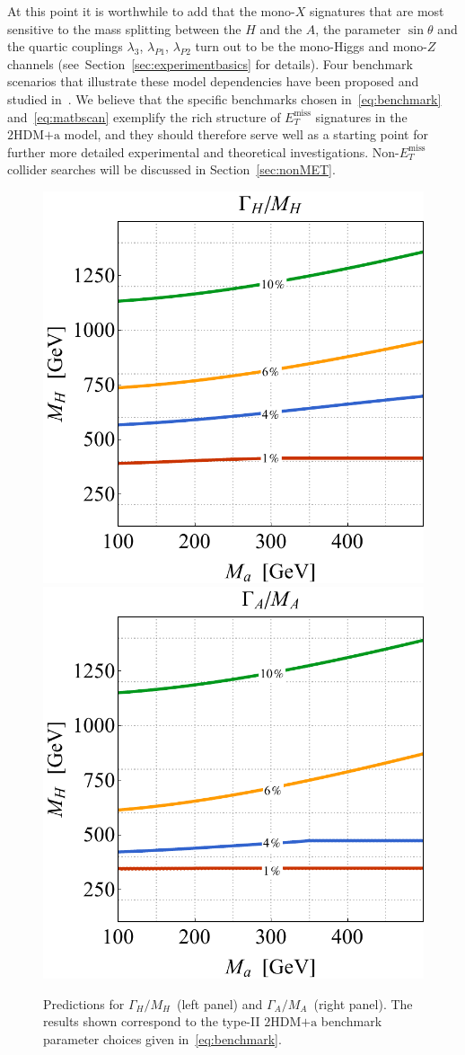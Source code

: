 \documentclass[a4paper, 11pt,notoc]{article}
\newcommand{\MET}{\ensuremath{E_T^\mathrm{miss}}\xspace}
\newcommand{\hdma}{\ensuremath{\textrm{2HDM+a}}\xspace}
\begin{document}
At this point it is worthwhile to add that the mono-$X$ signatures that are most sensitive to the mass splitting between the $H$ and the $A$, the parameter $\sin \theta$ and the quartic couplings $\lambda_{3}$, $\lambda_{P1}$, $\lambda_{P2}$ turn out to be  the mono-Higgs and mono-$Z$ channels (see~Section~\ref{sec:experimentbasics} for details). Four benchmark scenarios that illustrate these model dependencies have been proposed and studied in~\cite{Bauer:2017ota}.  We believe that the specific benchmarks  chosen in~\eqref{eq:benchmark} and~\eqref{eq:matbscan}   exemplify  the rich structure of $\MET$ signatures in the \hdma model, and they should therefore serve well as a starting point for further more detailed experimental and theoretical investigations. Non-$\MET$ collider searches will be discussed in Section~\ref{sec:nonMET}. 

\begin{figure}[t!]
\centering
\includegraphics[height=.45\textwidth]{figure5l.pdf} \qquad 
\includegraphics[height=.45\textwidth]{figure5r.pdf}
\vspace{4mm}
\caption{\label{fig:Gammas}  Predictions for  $\Gamma_H/M_H$~(left panel) and $\Gamma_A/M_A$~(right panel). The results shown correspond to the type-II \hdma benchmark parameter choices given in~\eqref{eq:benchmark}.}
\end{figure}
\end{document}
